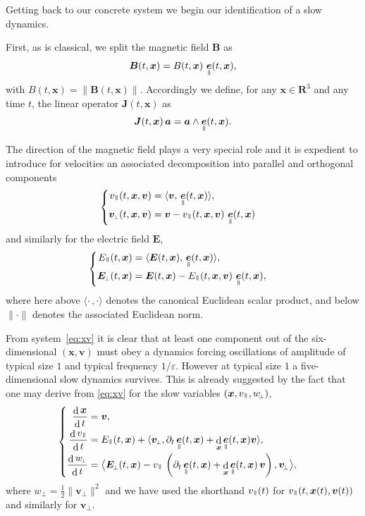 \documentclass[JEP,XML,SOM,Unicode]{cedram}
\newenvironment{splitcases}
{\begin{cases}\begin{aligned}}
{\end{aligned}\end{cases}}
\newcommand{\sperp}{{\scriptscriptstyle\perp}}
\newcommand{\blangle}{\bigl\langle}
\newcommand{\brangle}{\bigr\rangle}
\let\eps\varepsilon
\let\d\partial
\DeclareMathOperator\dD{d}\let\dd\dD
\theoremstyle{plain}
\theoremstyle{definition}
\newcommand{\be}{\begin{equation}}
\newcommand{\ee}{\end{equation}}
\newcommand\R{\mathbf R}
\newcommand\bB{{\boldsymbol B}}
\newcommand\bE{{\boldsymbol E}}
\newcommand\bJ{{\boldsymbol J}}
\newcommand\bfa{{\boldsymbol a}}
\newcommand\bfv{{\boldsymbol v}}
\newcommand\bfx{{\boldsymbol x}}
\DeclareMathOperator{\beD}{\boldsymbol{e}}
\newcommand\eDpar{\beD_\mypar}
\newcommand\vpar{v_\mypar}
\newcommand\bvperp{\bfv_{\!\sperp}}
\newcommand\eperp{w_{\!\sperp}}
\newcommand\Epar{E_\mypar}
\newcommand\Eperp{\bE_{\!\sperp}}
\newcommand{\mypar}{{\mkern3mu\vphantom{\perp}\vrule depth 0pt\mkern2mu\vrule depth 0pt\mkern3mu}}
\begin{document}
Getting back to our concrete system we begin our identification of a slow dynamics.

First, as is classical, we split the magnetic field $\bB$ as
\[
\bB(t,\bfx)=B(t,\bfx)\,\eDpar(t,\bfx),
\]
with $B(t,\bfx)=\|\bB(t,\bfx)\|$. Accordingly we define, for any $\bfx\in\R^3$ and any time $t$, the linear operator $\bJ(t,\bfx)$ as
\be
\label{def:J}
\bJ(t,\bfx) \,\bfa= \bfa\wedge \eDpar(t,\bfx).
\ee

The direction of the magnetic field plays a very special role and it is expedient to introduce for velocities an associated decomposition into parallel and orthogonal components
\[
\begin{splitcases}
\vpar(t,\bfx,\bfv) &=\langle\bfv,\,\eDpar(t,\bfx)\rangle,
\\
\bvperp(t,\bfx,\bfv)&=\bfv-\vpar(t,\bfx,\bfv)\,\eDpar(t,\bfx)
\end{splitcases}
\]
and similarly for the electric field $\bE$,
\[
\begin{splitcases}
\Epar(t,\bfx)&=\langle\bE(t,\bfx),\,\eDpar(t,\bfx)\rangle,
\\
\Eperp(t,\bfx)&=\bE(t,\bfx)-\Epar(t,\bfx,\bfv)\,\eDpar(t,\bfx),
\end{splitcases}
\]
where here above $\langle\cdot\,,\cdot\rangle$ denotes the canonical Euclidean scalar product, and below $\|\cdot\|$ denotes the associated Euclidean norm.

From system~\eqref{eq:xv} it is clear that at least one component out of the six-dimensional $(\bfx,\bfv)$ must obey a dynamics forcing oscillations of amplitude of typical size $1$ and typical frequency $1/\eps$. However at typical size $1$ a five-dimensional slow dynamics survives. This is already suggested by the fact that one may derive from \eqref{eq:xv} for the slow variables $(\bfx,\vpar,\eperp)$,
\be
\label{eq:1}
\begin{splitcases}

\frac{\dD\bfx}{\dD t} &=\bfv,
\\
\frac{\dD\vpar}{\dD t}&=\Epar(t,\bfx)+\langle \bvperp ,
\d_t\eDpar(t,\bfx)+\dD_{\bfx}\eDpar(t,\bfx)\bfv \rangle,
\\
\frac{\dD\eperp}{\dD t}&= \blangle \Eperp(t,\bfx) -\vpar\,\left(
\d_t\eDpar(t,\bfx)+\dD_{\bfx}\eDpar(t,\bfx)\,\bfv\right), \bvperp\brangle,
\end{splitcases}
\ee
where $\eperp=\tfrac12\|\bvperp\|^2$ and we have used the shorthand $\vpar(t)$ for
$\vpar(t,\bfx(t),\bfv(t))$ and similarly for $\bvperp$.
\end{document}
